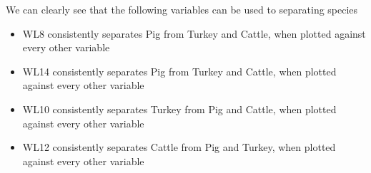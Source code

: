 \documentclass[openany]{article}
\begin{document}
	We can clearly see that the following variables can be used to separating species
	\begin{itemize}
		\item WL8 consistently separates Pig from Turkey and Cattle, when plotted against every other variable
		\item WL14 consistently separates Pig from Turkey and Cattle, when plotted against every other variable
		\item WL10 consistently separates Turkey from Pig and Cattle, when plotted against every other variable
		\item WL12 consistently separates Cattle from Pig and Turkey, when plotted against every other variable
		
	\end{itemize}
	\pagebreak
\end{document}
